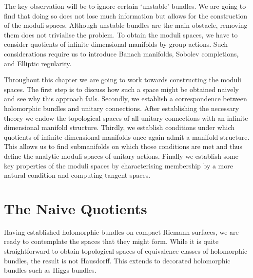\documentclass[12pt]{ociamthesis}  %
\begin{document}
The key observation will be to ignore certain `unstable' bundles. We
are going to find that doing so does not lose much information but
allows for the construction of the moduli spaces. Although unstable
bundles are the main obstacle, removing them does not trivialise the
problem. To obtain the moduli spaces, we have to consider quotients
of infinite dimensional manifolds by group actions. Such considerations
require us to introduce Banach manifolds, Sobolev completions, and
Elliptic regularity.

Throughout this chapter we are going to work towards constructing
the moduli spaces.
The first step is to discuss how such a space might be obtained naively
and see why this approach fails. Secondly, we establish a correspondence
between holomorphic bundles and unitary connections. After establishing the necessary
theory we endow the topological spaces of all unitary connections
with an infinite dimensional manifold structure. Thirdly, we establish
conditions under which quotients of infinite dimensional manifolds
once again admit a manifold structure. This allows us to find submanifolds on which
those conditions are met and thus define the analytic moduli spaces of
unitary actions. Finally we establish some key properties of the
moduli spaces by characterising membership by a more natural
condition and computing tangent spaces.

\section{The Naive Quotients}

Having established holomorphic bundles on compact Riemann surfaces,
we are ready to contemplate the spaces that they might form. While it is
quite straightforward to obtain topological spaces of equivalence
classes of holomorphic bundles, the result is not Hausdorff.
This extends to decorated holomorphic bundles such as Higgs bundles.
\end{document}
